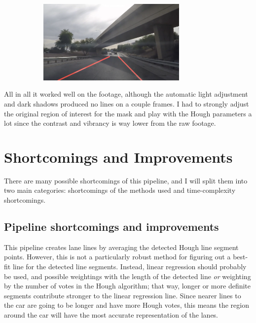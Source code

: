 \documentclass{article}
\begin{document}
\begin{figure}[htb!]
    \centering
    \caption{GoPro Annotated Line}
    
    \begin{subfigure}{0.5\textwidth}
    \centering
    \includegraphics[width=0.8\textwidth]{gopro}
    \end{subfigure}%
\end{figure}

All in all it worked well on the footage, although the automatic light adjustment and dark shadows produced no lines on a couple frames. I had to strongly adjust the original region of interest for the mask and play with the Hough parameters a lot since the contrast and vibrancy is way lower from the raw footage.




\section{Shortcomings and Improvements}

There are many possible shortcomings of this pipeline, and I will split them into two main categories: shortcomings of the methods used and time-complexity shortcomings.

\subsection{Pipeline shortcomings and improvements}

This pipeline creates lane lines by averaging the detected Hough line segment points. However, this is not a particularly robust method for figuring out a best-fit line for the detected line segments. Instead, linear regression should probably be used, and possible weightings with the length of the detected line \textit{or} weighting by the number of votes in the Hough algorithm; that way, longer or more definite segments contribute stronger to the linear regression line. Since nearer lines to the car are going to be longer and have more Hough votes, this means the region around the car will have the most accurate representation of the lanes.
\end{document}
